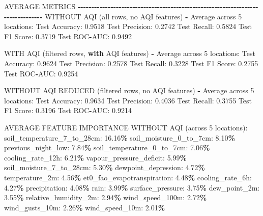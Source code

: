 \documentclass[
  letterpaper,
  DIV=11,
  numbers=noendperiod]{scrartcl}
\newenvironment{Shaded}{\begin{snugshade}}{\end{snugshade}}
\newcommand{\BuiltInTok}[1]{#1}
\newcommand{\ControlFlowTok}[1]{\textcolor[rgb]{0.13,0.29,0.53}{\textbf{#1}}}
\newcommand{\DecValTok}[1]{\textcolor[rgb]{0.00,0.00,0.81}{#1}}
\newcommand{\FloatTok}[1]{\textcolor[rgb]{0.00,0.00,0.81}{#1}}
\newcommand{\NormalTok}[1]{#1}
\newcommand{\OperatorTok}[1]{\textcolor[rgb]{0.81,0.36,0.00}{\textbf{#1}}}
\begin{document}
\begin{Shaded}
\begin{Highlighting}[]
\NormalTok{AVERAGE METRICS}
\OperatorTok{{-}{-}{-}{-}{-}{-}{-}{-}{-}{-}{-}{-}{-}{-}{-}{-}{-}{-}{-}{-}{-}{-}{-}{-}{-}{-}{-}{-}{-}{-}{-}{-}{-}{-}{-}{-}{-}{-}{-}{-}{-}{-}{-}{-}{-}{-}{-}{-}{-}{-}{-}{-}{-}{-}{-}{-}{-}{-}{-}{-}{-}{-}{-}{-}{-}{-}{-}{-}{-}{-}{-}{-}{-}{-}{-}{-}{-}{-}{-}{-}}
\NormalTok{WITHOUT AQI (}\BuiltInTok{all}\NormalTok{ rows, no AQI features) }\OperatorTok{{-}}\NormalTok{ Average across }\DecValTok{5}\NormalTok{ locations:}
\NormalTok{  Test Accuracy: }\FloatTok{0.9518}
\NormalTok{  Test Precision: }\FloatTok{0.2742}
\NormalTok{  Test Recall: }\FloatTok{0.5824}
\NormalTok{  Test F1 Score: }\FloatTok{0.3719}
\NormalTok{  Test ROC}\OperatorTok{{-}}\NormalTok{AUC: }\FloatTok{0.9492}

\NormalTok{WITH AQI (filtered rows, }\ControlFlowTok{with}\NormalTok{ AQI features) }\OperatorTok{{-}}\NormalTok{ Average across }\DecValTok{5}\NormalTok{ locations:}
\NormalTok{  Test Accuracy: }\FloatTok{0.9624}
\NormalTok{  Test Precision: }\FloatTok{0.2578}
\NormalTok{  Test Recall: }\FloatTok{0.3228}
\NormalTok{  Test F1 Score: }\FloatTok{0.2755}
\NormalTok{  Test ROC}\OperatorTok{{-}}\NormalTok{AUC: }\FloatTok{0.9254}

\NormalTok{WITHOUT AQI REDUCED (filtered rows, no AQI features) }\OperatorTok{{-}}\NormalTok{ Average across }\DecValTok{5}\NormalTok{ locations:}
\NormalTok{  Test Accuracy: }\FloatTok{0.9634}
\NormalTok{  Test Precision: }\FloatTok{0.4036}
\NormalTok{  Test Recall: }\FloatTok{0.3755}
\NormalTok{  Test F1 Score: }\FloatTok{0.3196}
\NormalTok{  Test ROC}\OperatorTok{{-}}\NormalTok{AUC: }\FloatTok{0.9214}

\NormalTok{AVERAGE FEATURE IMPORTANCE WITHOUT AQI (across }\DecValTok{5}\NormalTok{ locations):}
\NormalTok{  soil\_temperature\_7\_to\_28cm: }\FloatTok{16.16}\OperatorTok{\%}
\NormalTok{  soil\_moisture\_0\_to\_7cm: }\FloatTok{8.10}\OperatorTok{\%}
\NormalTok{  previous\_night\_low: }\FloatTok{7.84}\OperatorTok{\%}
\NormalTok{  soil\_temperature\_0\_to\_7cm: }\FloatTok{7.06}\OperatorTok{\%}
\NormalTok{  cooling\_rate\_12h: }\FloatTok{6.21}\OperatorTok{\%}
\NormalTok{  vapour\_pressure\_deficit: }\FloatTok{5.99}\OperatorTok{\%}
\NormalTok{  soil\_moisture\_7\_to\_28cm: }\FloatTok{5.30}\OperatorTok{\%}
\NormalTok{  dewpoint\_depression: }\FloatTok{4.72}\OperatorTok{\%}
\NormalTok{  temperature\_2m: }\FloatTok{4.56}\OperatorTok{\%}
\NormalTok{  et0\_fao\_evapotranspiration: }\FloatTok{4.48}\OperatorTok{\%}
\NormalTok{  cooling\_rate\_6h: }\FloatTok{4.27}\OperatorTok{\%}
\NormalTok{  precipitation: }\FloatTok{4.08}\OperatorTok{\%}
\NormalTok{  rain: }\FloatTok{3.99}\OperatorTok{\%}
\NormalTok{  surface\_pressure: }\FloatTok{3.75}\OperatorTok{\%}
\NormalTok{  dew\_point\_2m: }\FloatTok{3.55}\OperatorTok{\%}
\NormalTok{  relative\_humidity\_2m: }\FloatTok{2.94}\OperatorTok{\%}
\NormalTok{  wind\_speed\_100m: }\FloatTok{2.72}\OperatorTok{\%}
\NormalTok{  wind\_gusts\_10m: }\FloatTok{2.26}\OperatorTok{\%}
\NormalTok{  wind\_speed\_10m: }\FloatTok{2.01}\OperatorTok{\%}


\end{Highlighting}
\end{Shaded}
\end{document}
